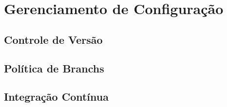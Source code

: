\chapter{Gerenciamento de Configuração}

\section{Controle de Versão}

\section{Política de Branchs}

\section{Integração Contínua}
